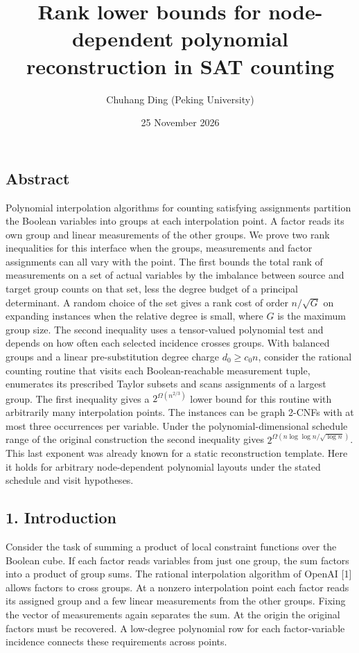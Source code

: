 \documentclass[
  10pt,
]{article}
\title{Rank lower bounds for node-dependent polynomial reconstruction in
SAT counting}
\author{Chuhang Ding (Peking University)}
\date{25 November 2026}
\begin{document}
\maketitle

\subsection{Abstract}\label{abstract}

Polynomial interpolation algorithms for counting satisfying assignments
partition the Boolean variables into groups at each interpolation point.
A factor reads its own group and linear measurements of the other
groups. We prove two rank inequalities for this interface when the
groups, measurements and factor assignments can all vary with the point.
The first bounds the total rank of measurements on a set of actual
variables by the imbalance between source and target group counts on
that set, less the degree budget of a principal determinant. A random
choice of the set gives a rank cost of order \(n/\sqrt G\) on expanding
instances when the relative degree is small, where \(G\) is the maximum
group size. The second inequality uses a tensor-valued polynomial test
and depends on how often each selected incidence crosses groups. With
balanced groups and a linear pre-substitution degree charge
\(d_0\ge c_0n\), consider the rational counting routine that visits each
Boolean-reachable measurement tuple, enumerates its prescribed Taylor
subsets and scans assignments of a largest group. The first inequality
gives a \(2^{\Omega(n^{2/3})}\) lower bound for this routine with
arbitrarily many interpolation points. The instances can be graph 2-CNFs
with at most three occurrences per variable. Under the
polynomial-dimensional schedule range of the original construction the
second inequality gives \(2^{\Omega(n\log\log n/\sqrt{\log n})}\). This
last exponent was already known for a static reconstruction template.
Here it holds for arbitrary node-dependent polynomial layouts under the
stated schedule and visit hypotheses.

\subsection{1. Introduction}\label{introduction}

Consider the task of summing a product of local constraint functions
over the Boolean cube. If each factor reads variables from just one
group, the sum factors into a product of group sums. The rational
interpolation algorithm of OpenAI {[}1{]} allows factors to cross
groups. At a nonzero interpolation point each factor reads its assigned
group and a few linear measurements from the other groups. Fixing the
vector of measurements again separates the sum. At the origin the
original factors must be recovered. A low-degree polynomial row for each
factor-variable incidence connects these requirements across points.
\end{document}
